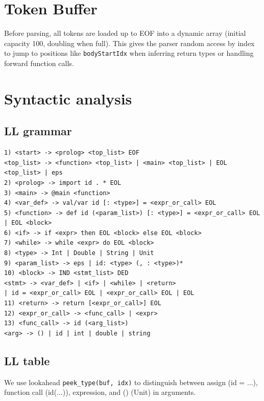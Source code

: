 \documentclass[12pt,a4paper]{article}
\begin{document}


\section{Token Buffer}          
Before parsing, all tokens are loaded up to EOF into a dynamic array (initial capacity 100, doubling when full). This gives the parser random access by index to jump to positions like \texttt{bodyStartIdx} when inferring return types or handling forward function calls.

\section{Syntactic analysis}      
\subsection{LL grammar}
\begin{verbatim}
1) <start> -> <prolog> <top_list> EOF
<top_list> -> <function> <top_list> | <main> <top_list> | EOL <top_list> | eps
2) <prolog> -> import id . * EOL
3) <main> -> @main <function>
4) <var_def> -> val/var id [: <type>] = <expr_or_call> EOL
5) <function> -> def id (<param_list>) [: <type>] = <expr_or_call> EOL | EOL <block>
6) <if> -> if <expr> then EOL <block> else EOL <block>
7) <while> -> while <expr> do EOL <block>
8) <type> -> Int | Double | String | Unit 
9) <param_list> -> eps | id: <type> (, : <type>)*
10) <block> -> IND <stmt_list> DED 
<stmt> -> <var_def> | <if> | <while> | <return> 
| id = <expr_or_call> EOL | <expr_or_call> EOL | EOL
11) <return> -> return [<expr_or_call>] EOL
12) <expr_or_call> -> <func_call> | <expr> 
13) <func_call> -> id (<arg_list>) 
<arg> -> () | id | int | double | string

\end{verbatim}

\subsection{LL table}
We use lookahead \texttt{peek\_type(buf, idx)} to distinguish between assign (id = ...), function call (id(...)), expression, and () (Unit) in arguments. 
\end{document}
